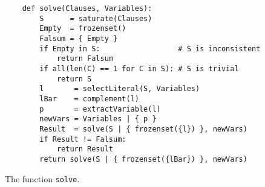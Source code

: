 \begin{figure}[!ht]
  \centering
\begin{verbatim}
    def solve(Clauses, Variables):
        S      = saturate(Clauses)
        Empty  = frozenset()
        Falsum = { Empty }
        if Empty in S:                  # S is inconsistent
            return Falsum           
        if all(len(C) == 1 for C in S): # S is trivial
            return S
        l       = selectLiteral(S, Variables)
        lBar    = complement(l)
        p       = extractVariable(l)
        newVars = Variables | { p }
        Result  = solve(S | { frozenset({l}) }, newVars)
        if Result != Falsum:
            return Result
        return solve(S | { frozenset({lBar}) }, newVars)
\end{verbatim}
\vspace*{-0.3cm}
  \caption{The function \texttt{solve}.}
  \label{fig:solve}
\end{figure} 
